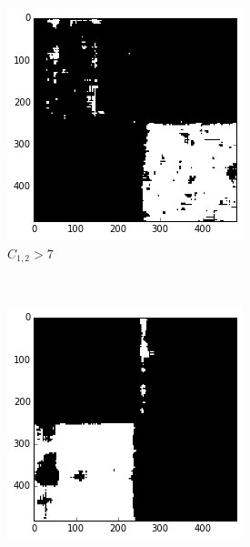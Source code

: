 \documentclass[a4paper]{article}
\begin{document}
\begin{figure}
\begin{subfigure}[b]{0.23\textwidth}
        \includegraphics[width=\textwidth]{segm_2_c12_hi.png}
        \caption{%
            $C_{1,2} > 7$
        }
    \end{subfigure}
    ~
    \begin{subfigure}[b]{0.23\textwidth}
        \centering
        \includegraphics[width=\textwidth]{segm_2_i22_low.png}

\end{subfigure}
\end{figure}
\end{document}
